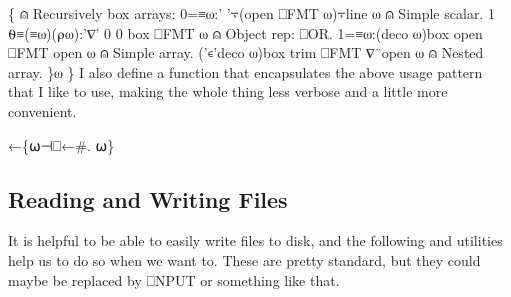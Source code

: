 \documentclass{article}%
\begin{document}
        \{                                                                                                                                                       ⍝ Recursively box arrays:
                0=≡⍵:' '⍪(open ⎕FMT ⍵)⍪line ⍵                             ⍝ Simple scalar.
                1 ⍬≡(≡⍵)(⍴⍵):'∇' 0 0 box ⎕FMT ⍵                       ⍝ Object rep: ⎕OR.
                1=≡⍵:(deco ⍵)box open ⎕FMT open ⍵             ⍝ Simple array.
                ('∊'deco ⍵)box trim ⎕FMT ∇¨open ⍵            ⍝ Nested array.
        \}⍵
\}
\eatline
{}\nwendcode{}\nwdocspar
I also define a function {\Tt{}\nwendquote} that encapsulates the above usage
pattern that I like to use, making the whole thing less verbose and
a little more convenient.

\nwenddocs{}\endmoddef\nwstartdeflinemarkup\nwenddeflinemarkup
{}←\{⍵⊣⎕←#. ⍵\}
\eatline
{}\nwendcode{}\nwdocspar


\subsection{Reading and Writing Files}

It is helpful to be able to easily write files to disk, and the
following {\Tt{}\nwendquote} and {\Tt{}\nwendquote} utilities help us to do so when we
want to.
These are pretty standard, but they could maybe be replaced by
{\Tt{}⎕NPUT\nwendquote} or something like that.
\end{document}
